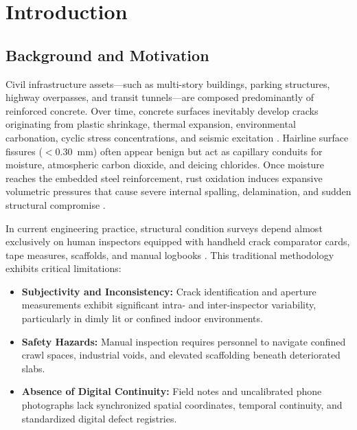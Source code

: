 \documentclass[12pt,a4paper,oneside]{report}
\begin{document}
\clearpage
\tableofcontents
\clearpage
\listoftables
\clearpage
\listoffigures
\clearpage


\chapter{Introduction}
\label{ch:intro}

\section{Background and Motivation}
Civil infrastructure assets---such as multi-story buildings, parking structures, highway overpasses, and transit tunnels---are composed predominantly of reinforced concrete. Over time, concrete surfaces inevitably develop cracks originating from plastic shrinkage, thermal expansion, environmental carbonation, cyclic stress concentrations, and seismic excitation \cite{cha2017}. Hairline surface fissures ($<0.30$~mm) often appear benign but act as capillary conduits for moisture, atmospheric carbon dioxide, and deicing chlorides. Once moisture reaches the embedded steel reinforcement, rust oxidation induces expansive volumetric pressures that cause severe internal spalling, delamination, and sudden structural compromise \cite{aci224}.

In current engineering practice, structural condition surveys depend almost exclusively on human inspectors equipped with handheld crack comparator cards, tape measures, scaffolds, and manual logbooks \cite{aci201}. This traditional methodology exhibits critical limitations:
\begin{itemize}
  \item \textbf{Subjectivity and Inconsistency:} Crack identification and aperture measurements exhibit significant intra- and inter-inspector variability, particularly in dimly lit or confined indoor environments.
  \item \textbf{Safety Hazards:} Manual inspection requires personnel to navigate confined crawl spaces, industrial voids, and elevated scaffolding beneath deteriorated slabs.
  \item \textbf{Absence of Digital Continuity:} Field notes and uncalibrated phone photographs lack synchronized spatial coordinates, temporal continuity, and standardized digital defect registries.
\end{itemize}
\end{document}
